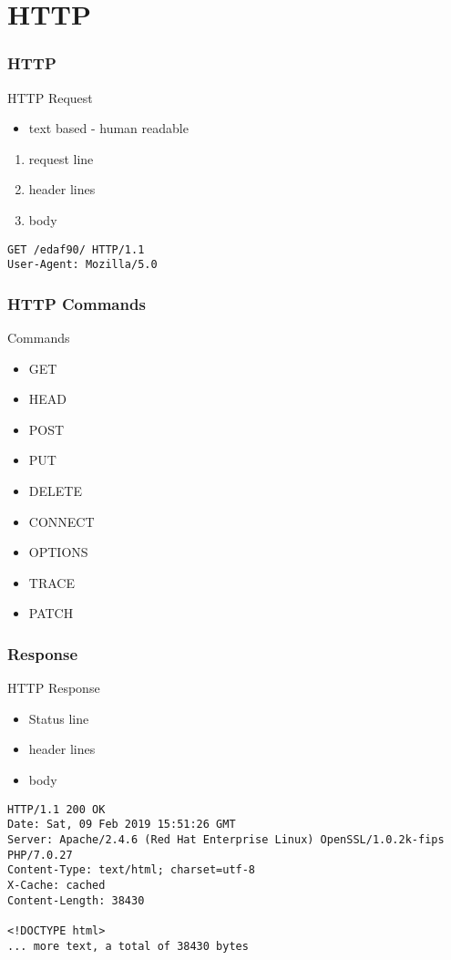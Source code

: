 \section{HTTP}
\begin{frame}[fragile]\frametitle{HTTP}
\color{structure}
HTTP Request
\begin{itemize}\color{structure}
  \item text based - human readable
\end{itemize}
\begin{enumerate}
  \item request line
  \item header lines
  \item body
\end{enumerate}
\vspace{5mm}
\noindent
\begin{verbatim}
GET /edaf90/ HTTP/1.1
User-Agent: Mozilla/5.0
\end{verbatim}
\end{frame}

\begin{frame}[fragile]\frametitle{HTTP Commands}
\color{structure}
Commands
\begin{itemize}\color{structure}
\item GET
\item HEAD
\item POST
\item PUT
\item DELETE
\item CONNECT
\item OPTIONS
\item TRACE
\item PATCH
\end{itemize}
\end{frame}

\begin{frame}[fragile]\frametitle{Response}
\color{structure}
HTTP Response
\begin{itemize}\color{structure}
\item  Status line
\item  header lines
\item  body
\end{itemize}

\begin{verbatim}
HTTP/1.1 200 OK
Date: Sat, 09 Feb 2019 15:51:26 GMT
Server: Apache/2.4.6 (Red Hat Enterprise Linux) OpenSSL/1.0.2k-fips PHP/7.0.27
Content-Type: text/html; charset=utf-8
X-Cache: cached
Content-Length: 38430

<!DOCTYPE html>
... more text, a total of 38430 bytes
\end{verbatim}
\end{frame}

